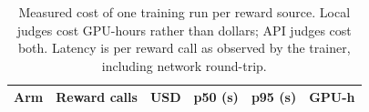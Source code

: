 \begin{table}[t]\centering\small
\caption{Measured cost of one training run per reward source. Local judges cost
GPU-hours rather than dollars; API judges cost both. Latency is per reward call
as observed by the trainer, including network round-trip.}
\label{tab:cost}
\begin{tabular}{lccccc}
\toprule
Arm & Reward calls & USD & p50 (s) & p95 (s) & GPU-h \\
\midrule

\bottomrule
\end{tabular}
\end{table}
